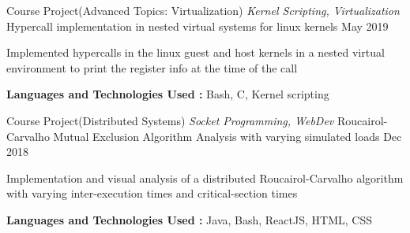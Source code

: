 

\begin{cventries}

  \cventry
    {Course Project(Advanced Topics: Virtualization)  \textit{Kernel Scripting, Virtualization}} %
    {Hypercall implementation in nested virtual systems for linux kernels} %
    {} %
    {May 2019} %
    {
      \begin{cvitems}
      \item{Implemented hypercalls in the linux guest and host kernels in a nested virtual environment to print the register info at the time of the call}
      \item{\textbf{Languages and Technologies Used :} Bash, C, Kernel scripting}
      \end{cvitems}
    }

  \cventry
    {Course Project(Distributed Systems)  \textit{Socket Programming, WebDev}} %
    {Roucairol-Carvalho Mutual Exclusion Algorithm Analysis with varying simulated loads} %
    {} %
    {Dec 2018} %
    {
      \begin{cvitems}
      \item{Implementation and visual analysis of a distributed Roucairol-Carvalho algorithm with varying inter-execution times and critical-section times}
      \item{\textbf{Languages and Technologies Used :} Java, Bash, ReactJS, HTML, CSS}
      \end{cvitems}
    }


\end{cventries}

